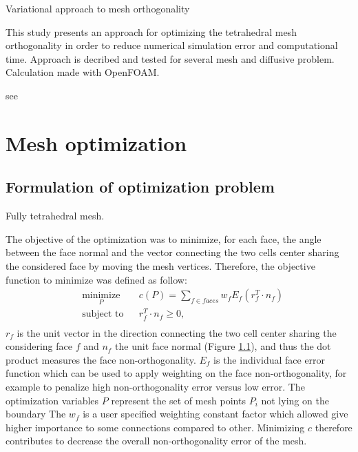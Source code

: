 \documentclass[11pt]{article}
\begin{document}
Variational approach to mesh orthogonality

This study presents an approach for optimizing the tetrahedral mesh orthogonality in order to reduce numerical simulation error and computational time.
Approach is decribed and tested for several mesh and diffusive problem.
Calculation made with OpenFOAM.


see %



\section{Mesh optimization}


\subsection{Formulation of optimization problem}

Fully tetrahedral mesh.

The objective of the optimization was to minimize, for each face, the angle between the face normal and the vector connecting the two cells center sharing the considered face by moving the mesh vertices. 
Therefore, the objective function to minimize was defined as follow:
%
\begin{equation}
\begin{aligned}
& \underset{P}{\text{minimize}}
& & c(P) = \sum_{f \in faces} w_f E_f \left( r_f^T \cdot n_f \right)  \\
& \text{subject to}
& & r_f^T \cdot n_f \geq 0, \\
\end{aligned}
\label{eq:opt_problem}
\end{equation}
$r_f$ is the unit vector in the direction connecting the two cell center sharing the considering face $f$ and $n_f$ the unit face normal (Figure \ref{}), and thus the dot product measures the face non-orthogonality.
$E_f$ is the individual face error function which can be used to apply weighting on the face non-orthogonality, for example to penalize high non-orthogonality error versus low error.
The optimization variables $P$ represent the set of mesh points $P_i$ not lying on the boundary %
The $w_f$ is a user specified weighting constant factor which allowed give higher importance to some connections compared to other.
Minimizing $c$ therefore contributes to decrease the overall non-orthogonality error of the mesh.
\end{document}
